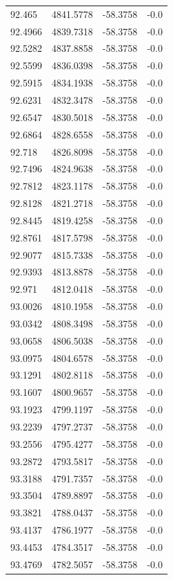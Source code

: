 \begin{table}[H]
\begin{tabular}{llll}
92.465 & 4841.5778 & -58.3758 & -0.0 \\
92.4966 & 4839.7318 & -58.3758 & -0.0 \\
92.5282 & 4837.8858 & -58.3758 & -0.0 \\
92.5599 & 4836.0398 & -58.3758 & -0.0 \\
92.5915 & 4834.1938 & -58.3758 & -0.0 \\
92.6231 & 4832.3478 & -58.3758 & -0.0 \\
92.6547 & 4830.5018 & -58.3758 & -0.0 \\
92.6864 & 4828.6558 & -58.3758 & -0.0 \\
92.718 & 4826.8098 & -58.3758 & -0.0 \\
92.7496 & 4824.9638 & -58.3758 & -0.0 \\
92.7812 & 4823.1178 & -58.3758 & -0.0 \\
92.8128 & 4821.2718 & -58.3758 & -0.0 \\
92.8445 & 4819.4258 & -58.3758 & -0.0 \\
92.8761 & 4817.5798 & -58.3758 & -0.0 \\
92.9077 & 4815.7338 & -58.3758 & -0.0 \\
92.9393 & 4813.8878 & -58.3758 & -0.0 \\
92.971 & 4812.0418 & -58.3758 & -0.0 \\
93.0026 & 4810.1958 & -58.3758 & -0.0 \\
93.0342 & 4808.3498 & -58.3758 & -0.0 \\
93.0658 & 4806.5038 & -58.3758 & -0.0 \\
93.0975 & 4804.6578 & -58.3758 & -0.0 \\
93.1291 & 4802.8118 & -58.3758 & -0.0 \\
93.1607 & 4800.9657 & -58.3758 & -0.0 \\
93.1923 & 4799.1197 & -58.3758 & -0.0 \\
93.2239 & 4797.2737 & -58.3758 & -0.0 \\
93.2556 & 4795.4277 & -58.3758 & -0.0 \\
93.2872 & 4793.5817 & -58.3758 & -0.0 \\
93.3188 & 4791.7357 & -58.3758 & -0.0 \\
93.3504 & 4789.8897 & -58.3758 & -0.0 \\
93.3821 & 4788.0437 & -58.3758 & -0.0 \\
93.4137 & 4786.1977 & -58.3758 & -0.0 \\
93.4453 & 4784.3517 & -58.3758 & -0.0 \\
93.4769 & 4782.5057 & -58.3758 & -0.0 \\

\end{tabular}
\end{table}
